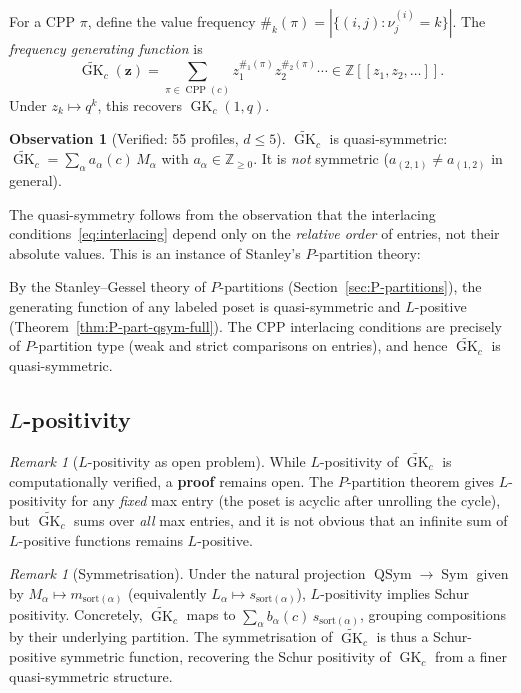 \documentclass[11pt]{article}
\theoremstyle{plain}
\theoremstyle{definition}
\newtheorem{observation}[theorem]{Observation}
\theoremstyle{remark}
\newtheorem{remark}[theorem]{Remark}
\newcommand{\Z}{\mathbb{Z}}
\newcommand{\CPP}{\operatorname{CPP}}
\newcommand{\GK}{\operatorname{GK}}
\newcommand{\QSym}{\operatorname{QSym}}
\newcommand{\Sym}{\operatorname{Sym}}
\begin{document}
For a CPP $\pi$, define the value frequency
$\#_k(\pi) = |\{(i,j) : \nu^{(i)}_j = k\}|$.
The \emph{frequency generating function} is
\begin{equation}\label{eq:GKtilde}
  \widetilde{\GK}_c(\mathbf{z})
  = \sum_{\pi \in \CPP(c)}
  z_1^{\#_1(\pi)} z_2^{\#_2(\pi)} \cdots
  \in \Z[[z_1, z_2, \ldots]].
\end{equation}
Under $z_k \mapsto q^k$, this recovers $\GK_c(1,q)$.

\begin{observation}[Verified: 55 profiles, $d \leq 5$]
\label{obs:qsym}
$\widetilde{\GK}_c$ is quasi-symmetric:
$\widetilde{\GK}_c = \sum_\alpha a_\alpha(c)\, M_\alpha$
with $a_\alpha \in \Z_{\geq 0}$.
It is \emph{not} symmetric ($a_{(2,1)} \neq a_{(1,2)}$ in general).
\end{observation}

The quasi-symmetry follows from the observation that the
interlacing conditions~\eqref{eq:interlacing} depend only on the
\emph{relative order} of entries, not their absolute values.
This is an instance of Stanley's $P$-partition theory:

By the Stanley--Gessel theory of $P$-partitions
(Section~\ref{sec:P-partitions}), the generating function
of any labeled poset is quasi-symmetric and $L$-positive
(Theorem~\ref{thm:P-part-qsym-full}).
The CPP interlacing conditions are precisely of
$P$-partition type (weak and strict comparisons on entries),
and hence $\widetilde{\GK}_c$ is quasi-symmetric.

\subsection{$L$-positivity}

\begin{remark}[$L$-positivity as open problem]\label{rem:L-pos-open}
While $L$-positivity of $\widetilde{\GK}_c$ is computationally
verified, a \textbf{proof} remains open.  The $P$-partition
theorem gives $L$-positivity for any \emph{fixed} max entry
(the poset is acyclic after unrolling the cycle), but
$\widetilde{\GK}_c$ sums over \emph{all} max entries, and
it is not obvious that an infinite sum of $L$-positive
functions remains $L$-positive.
\end{remark}

\begin{remark}[Symmetrisation]\label{rem:symmetrisation}
Under the natural projection $\QSym \to \Sym$ given by
$M_\alpha \mapsto m_{\mathrm{sort}(\alpha)}$
(equivalently $L_\alpha \mapsto s_{\mathrm{sort}(\alpha)}$),
$L$-positivity implies Schur positivity.
Concretely, $\widetilde{\GK}_c$ maps to
$\sum_\alpha b_\alpha(c)\, s_{\mathrm{sort}(\alpha)}$,
grouping compositions by their underlying partition.
The symmetrisation of $\widetilde{\GK}_c$ is thus a
Schur-positive symmetric function, recovering the Schur
positivity of $\GK_c$ from a finer quasi-symmetric structure.
\end{remark}
\end{document}

